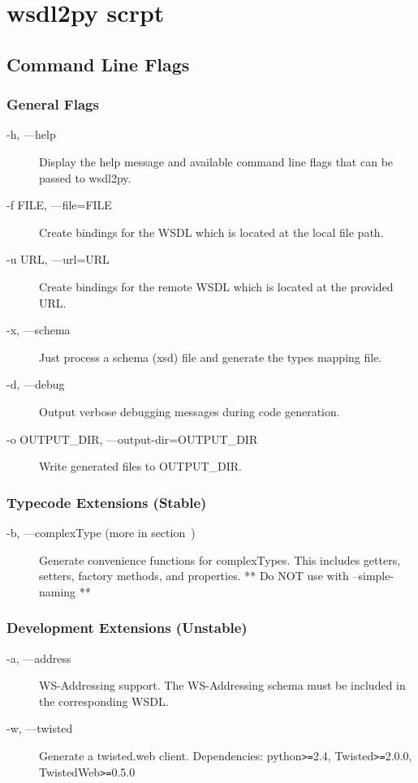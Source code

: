 \chapter{wsdl2py scrpt}

\section{Command Line Flags}

\subsection{General Flags}
\begin{description}
\item[-h, ---help] Display the help message and available command line
flags that can be passed to wsdl2py.
\item[-f FILE, ---file=FILE] Create bindings for the WSDL which is located at
the local file path.
\item[-u URL, ---url=URL] Create bindings for the remote WSDL which is located
at the provided URL.
\item[-x, ---schema] Just process a schema (xsd) file and generate the types
mapping file.
\item[-d, ---debug] Output verbose debugging messages during code generation.
\item[-o OUTPUT_DIR, ---output-dir=OUTPUT_DIR] Write generated files to OUTPUT_DIR.
\end{description}

\subsection{Typecode Extensions (Stable) }
\begin{description}
\item[-b, ---complexType (more in section~\label{subsubsection:complexType})]
Generate convenience functions for complexTypes.  This includes getters,
setters, factory methods, and properties.  ** Do NOT use with --simple-naming **
\end{description}

\subsection{Development Extensions (Unstable) }
\begin{description}
\item[-a, ---address] WS-Addressing support.  The WS-Addressing schema must be
included in the corresponding WSDL.
\item[-w, ---twisted] Generate a twisted.web client.  Dependencies: 
python\verb!>=!2.4, Twisted\verb!>=!2.0.0, TwistedWeb\verb!>=!0.5.0
\end{description}

